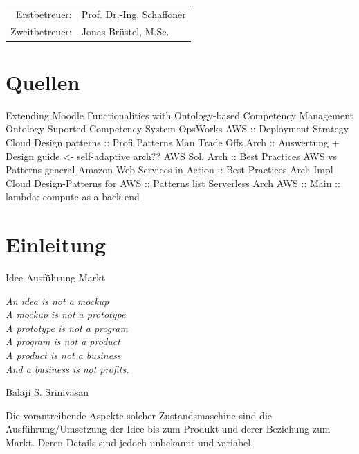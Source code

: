 \documentclass[
12pt,
english,
ngerman,
headsepline,
twoside,
openright,
numbers=noenddot,version=first
]{scrreprt}
\providecommand{\tabularnewline}{\\}
\let\myTOC\tableofcontents
\renewcommand\tableofcontents{
    \begin{spacing}{1.1}
    \myTOC
    \end{spacing}
    \clearpage
    \pagenumbering{arabic}
}
\begin{document}
\vspace{1cm}

\noindent \begin{center}
\medskip{}
\begin{tabular}{rl}
Erstbetreuer: & Prof. Dr.-Ing. Schafföner\tabularnewline
Zweitbetreuer: & Jonas Brüstel, M.Sc.\tabularnewline
\end{tabular}
\par\end{center}

\noindent \begin{center}
{\huge }
\par\end{center}{\huge \par}

\newpage{}

%
\tableofcontents{}

\pagestyle{scrheadings}   

\chapter{Quellen}
Extending Moodle Functionalities with Ontology-based Competency Management
Ontology Suported Competency System
OpsWorks AWS :: Deployment Strategy
Cloud Design patterns :: Profi Patterns
Man Trade Offs Arch :: Auswertung + Design guide  <- self-adaptive arch?? 
AWS Sol. Arch :: Best Practices AWS vs Patterns general 
Amazon Web Services in Action :: Best Practices Arch
Impl Cloud Design-Patterns for AWS :: Patterns list
Serverless Arch AWS :: Main :: lambda: compute as a back end 


\chapter{Einleitung}{Idee-Ausführung-Markt}
\setcounter{page}{1}
\label{chap:introduction}
\epigraph{\textit{\textquotedbl{}
		An idea is not a mockup\\
		A mockup is not a prototype\\
		A prototype is not a program\\
		A program is not a product\\
		A product is not a business\\
		And a business is not profits.\textquotedbl{}}}{
	Balaji S. Srinivasan }


Die vorantreibende Aspekte solcher Zustandsmaschine sind die Ausführung/Umsetzung der Idee bis zum Produkt und derer Beziehung zum Markt. Deren Details sind jedoch unbekannt und variabel. 
\end{document}
